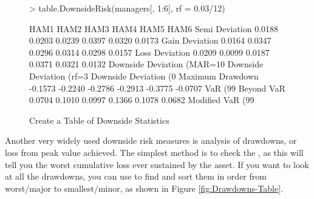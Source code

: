 \documentclass[12pt,letterpaper,english]{article}
\begin{document}
%
\begin{figure}

\caption{Create a Table of Downside Statistics}

\label{fig:Downside-Table}

\begin{center}

\begin{Schunk}
\begin{Sinput}
> table.DownsideRisk(managers[, 1:6], rf = 0.03/12)
\end{Sinput}
\begin{Soutput}
                                HAM1    HAM2    HAM3    HAM4    HAM5    HAM6
Semi Deviation                0.0188  0.0203  0.0239  0.0397  0.0320  0.0173
Gain Deviation                0.0164  0.0347  0.0296  0.0314  0.0298  0.0157
Loss Deviation                0.0209  0.0099  0.0187  0.0371  0.0321  0.0132
Downside Deviation (MAR=10%)  0.0175  0.0168  0.0218  0.0386  0.0346  0.0152
Downside Deviation (rf=3%)    0.0151  0.0133  0.0188  0.0357  0.0316  0.0125
Downside Deviation (0%)       0.0142  0.0119  0.0176  0.0345  0.0303  0.0114
Maximum Drawdown             -0.1573 -0.2240 -0.2786 -0.2913 -0.3775 -0.0707
VaR (99%)                     0.0696  0.0996  0.0985  0.1352  0.1075  0.0674
Beyond VaR                    0.0704  0.1010  0.0997  0.1366  0.1078  0.0682
Modified VaR (99%)            0.1101  0.0814  0.1150  0.1971  0.1614  0.0847
\end{Soutput}
\end{Schunk}

\end{center}
\end{figure}


Another very widely used downside risk measures is analysis of drawdowns,
or loss from peak value achieved. The simplest method is to check
the , as this will tell you the worst
cumulative loss ever sustained by the asset. If you want to look at
all the drawdowns, you can use 
to find and sort them in order from worst/major to smallest/minor,
as shown in Figure \ref{fig:Drawdowns-Table}.
\end{document}
